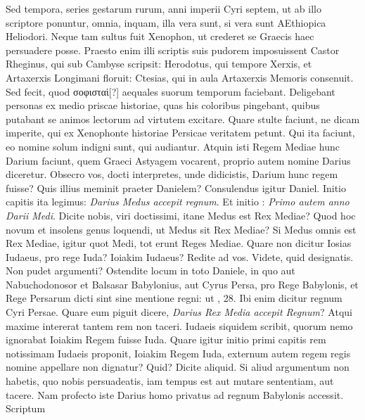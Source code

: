 Sed tempora,
series gestarum rurum, anni imperii Cyri septem, ut ab illo
scriptore ponuntur, omnia, inquam, illa vera sunt, si vera sunt AEthiopica
Heliodori.
Neque tam sultus fuit Xenophon, ut crederet se
Graecis haec persuadere posse.
Praesto enim illi scriptis suis pudorem
imposuissent Castor Rheginus, qui sub Cambyse scripsit: Herodotus,
qui tempore Xerxis, et Artaxerxis Longimani floruit: Ctesias, qui in
aula Artaxerxis Memoris consenuit.
Sed fecit, quod \textgreek{σοφισταὶ[?]} aequales
suorum temporum faciebant.
Deligebant personas ex medio priscae
historiae, quas his coloribus pingebant, quibus putabant se animos
lectorum ad virtutem excitare.
Quare stulte faciunt, ne dicam
imperite, qui ex Xenophonte historiae Persicae veritatem petunt.
Qui ita faciunt, eo nomine solum indigni sunt, qui audiantur.
Atquin isti Regem Mediae hunc Darium faciunt, quem Graeci Astyagem
vocarent, proprio autem nomine Darius diceretur.
Obsecro
vos, docti interpretes, unde didicistis, Darium hunc regem fuisse?
Quis illius meminit praeter Danielem?
Consulendus igitur Daniel.
Initio  capitis ita legimus:
 \textit{Darius Medus accepit regnum}.
Et initio : \textit{Primo autem anno Darii Medi}.
Dicite nobis, viri doctissimi, itane
Medus est Rex Mediae?
Quod hoc novum et insolens genus loquendi,
ut Medus sit Rex Mediae?
Si Medus omnis est Rex Mediae,
igitur quot Medi, tot erunt Reges Mediae.
Quare non dicitur Iosias
Iudaeus, pro rege Iuda?
Ioiakim Iudaeus?
Redite ad vos.
Videte, quid
designatis.
Non pudet argumenti?
Ostendite locum in toto Daniele,
in quo aut Nabuchodonosor et Balsasar Babylonius, aut Cyrus
Persa, pro Rege Babylonis, et Rege Persarum dicti sint sine mentione
regni: ut , 28.
Ibi enim dicitur regnum Cyri Persae.
Quare eum piguit dicere, \textit{Darius Rex Media accepit Regnum}?
Atqui maxime intererat
tantem rem non taceri.
Iudaeis siquidem scribit, quorum nemo
ignorabat Ioiakim Regem fuisse Iuda.
Quare igitur initio primi
capitis rem notissimam Iudaeis proponit, Ioiakim Regem Iuda, externum
autem regem regis nomine appellare non dignatur?
Quid?
Dicite aliquid.
Si aliud argumentum non habetis, quo nobis persuadeatis,
iam tempus est aut mutare sententiam, aut tacere.
Nam profecto iste Darius homo privatus ad regnum Babylonis accessit.
Scriptum
